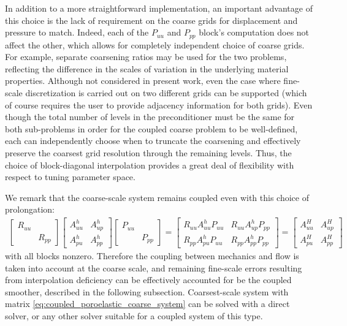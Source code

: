 In addition to a more straightforward implementation, an important advantage of this choice is the lack of requirement on the coarse grids for displacement and pressure to match.   Indeed, each of the $P_{uu}$ and $P_{pp}$ block's computation does not affect the other, which allows for completely independent choice of coarse grids.   For example, separate coarsening ratios may be used for the two problems, reflecting the difference in the scales of variation in the underlying material properties.   Although not considered in present work, even the case where fine-scale discretization is carried out on two different grids can be supported (which of course requires the user to provide adjacency information for both grids).   Even though the total number of levels in the preconditioner must be the same for both sub-problems in order for the coupled coarse problem to be well-defined, each can independently choose when to truncate the coarsening and effectively preserve the coarsest grid resolution through the remaining levels.   Thus, the choice of block-diagonal interpolation provides a great deal of flexibility with respect to tuning parameter space.

We remark that the coarse-scale system remains coupled even with this choice of prolongation:
\begin{align}
    \begin{bmatrix}
		R_{uu} &       \\
		       & R_{pp}
	\end{bmatrix}
	\begin{bmatrix}
		A_{uu}^h & A_{up}^h \\
		A_{pu}^h & A_{pp}^h
	\end{bmatrix}
	\begin{bmatrix}
	    P_{uu} &       \\
		       & P_{pp}
	\end{bmatrix} =
	\begin{bmatrix}
	    R_{uu} A_{uu}^h P_{uu} & R_{uu} A_{up}^h P_{pp} \\
	    R_{pp} A_{pu}^h P_{uu} & R_{pp} A_{pp}^h P_{pp}
	\end{bmatrix} =
	\begin{bmatrix}
		A_{uu}^H & A_{up}^H \\
		A_{pu}^H & A_{pp}^H
	\end{bmatrix}
	\label{eq:coupled_poroelastic_coarse_system}
\end{align}
with all blocks nonzero.   Therefore the coupling between mechanics and flow is taken into account at the coarse scale, and remaining fine-scale errors resulting from interpolation deficiency can be effectively accounted for be the coupled smoother, described in the following subsection.   Coarsest-scale system with matrix \eqref{eq:coupled_poroelastic_coarse_system} can be solved with a direct solver, or any other solver suitable for a coupled system of this type.

